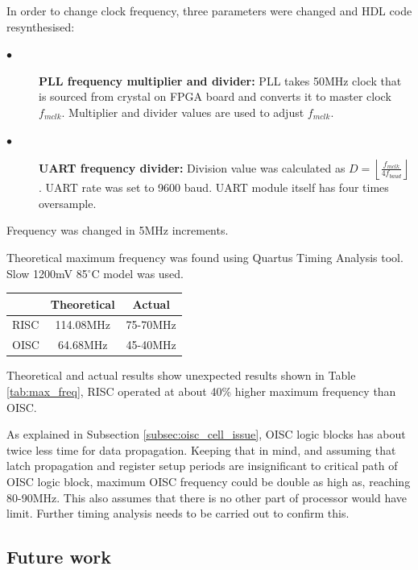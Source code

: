 In order to change clock frequency, three parameters were changed and HDL code resynthesised: 
\begin{description}
	\item[$\bullet$] \textbf{PLL frequency multiplier and divider:}
	PLL takes 50MHz clock that is sourced from crystal on FPGA board and converts it to master clock $f_{mclk}$. Multiplier and divider values are used to adjust $f_{mclk}$.
	
	\item[$\bullet$] \textbf{UART frequency divider:}
	Division value was calculated as $D = \left \lfloor \frac{f_{mclk}}{4 f_{baud}} \right \rfloor$. UART rate was set to 9600 baud. UART module itself has four times oversample. 
\end{description}
Frequency was changed in 5MHz increments. 

Theoretical maximum frequency was found using Quartus Timing Analysis tool. Slow 1200mV 85$^{\circ}$C model was used. 

\begin{center}
	\begin{tabular}{ l | c | c  }
		     & Theoretical & Actual \\ \hline
		RISC & 114.08MHz & 75-70MHz \\ \hline
		OISC & 64.68MHz & 45-40MHz \\
	\end{tabular}
	\label{tab:max_freq}
\end{center}

Theoretical and actual results show unexpected results shown in Table \ref{tab:max_freq}, RISC operated at about 40\% higher maximum frequency than OISC.

As explained in Subsection \ref{subsec:oisc_cell_issue}, OISC logic blocks has about twice less time for data propagation. Keeping that in mind, and assuming that latch propagation and register setup periods are insignificant to critical path of OISC logic block, maximum OISC frequency could be double as high as, reaching 80-90MHz. This also assumes that there is no other part of processor would have limit. Further timing analysis needs to be carried out to confirm this.

\subsection{Future work}

